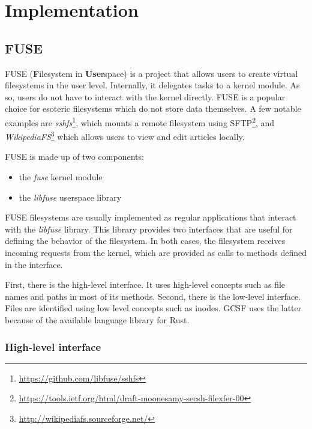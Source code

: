 \section{Implementation} \label{implementation}

\subsection{FUSE}

FUSE (\textbf{F}ilesystem in \textbf{Use}rspace) is a project that allows users to create virtual filesystems in the user level. Internally, it delegates tasks to a kernel module. As so, users do not have to interact with the kernel directly. FUSE is a popular choice for esoteric filesystems which do not store data themselves. A few notable examples are \emph{sshfs}\footnote{\url{https://github.com/libfuse/sshfs}}, which mounts a remote filesystem using SFTP\footnote{\url{https://tools.ietf.org/html/draft-moonesamy-secsh-filexfer-00}}, and \emph{WikipediaFS}\footnote{\url{http://wikipediafs.sourceforge.net/}} which allows users to view and edit articles locally.

FUSE is made up of two components:
\begin{itemize}
  \item the \textit{fuse} kernel module
  \item the \textit{libfuse} userspace library
\end{itemize}

FUSE filesystems are usually implemented as regular applications that interact with the \textit{libfuse} library. This library provides two interfaces that are useful for defining the behavior of the filesystem. In both cases, the filesystem receives incoming requests from the kernel, which are provided as calls to methods defined in the interface.

First, there is the high-level interface. It uses high-level concepts such as file names and paths in most of its methods. Second, there is the low-level interface. Files are identified using low level concepts such as inodes\cite{tanenbaum}. GCSF uses the latter because of the available language library for Rust.

\subsubsection{High-level interface}



